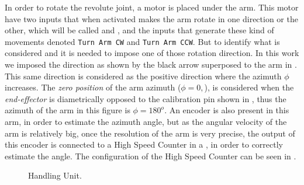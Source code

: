 In order to rotate the revolute joint, a motor is placed
under the arm. This motor have two inputs that when activated makes the arm
rotate in one direction or the other, which will be called \CW{} and \CCW, and
the inputs that generate these kind of movements denoted
\verb|Turn Arm CW| and \verb|Turn Arm CCW|. But to identify what is considered
\CW{} and \CCW{} it is needed to impose one of those rotation direction. In this
work we imposed the \CCW{} direction as shown by the black arrow superposed to
the arm in . This same direction is considered as the
positive direction where the azimuth $\phi$ increases. The
\emph{zero position} of the arm azimuth ($\phi=0,$), is considered when the
\emph{end-effector} is diametrically opposed to the calibration pin shown in
, thus the azimuth of the arm in this figure is
$\phi=180^o$. An encoder is also present in this arm, in order to estimate the
azimuth angle, but as the angular velocity of the arm is relatively big, once
the resolution of the arm is very precise, the output of this encoder is connected to a High Speed
Counter in a \PLC, in order to correctly estimate the angle. The configuration
of the High Speed Counter can be seen in \cite{rochapereira2019automacao,antunesfloriano2019sincronizacao}.
\begin{figure}[H]
  \centering
  \caption{Handling Unit.}
  \label{fig:handlingUnit}
\end{figure}


